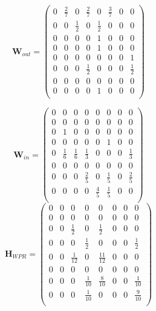 \documentclass[11pt]{report}
\begin{document}
\[\textbf{W}_{out}=\left(
\begin{array}{cccccccc}
0 & \frac{2}{7} & 0 & \frac{2}{7} & 0 &\frac{3}{7} & 0 & 0 \\
0 & 0 &\frac{1}{2}& 0 &\frac{1}{2}& 0 & 0 & 0\\
0 & 0 & 0 & 0 & 1 & 0 & 0 & 0\\
0 & 0 & 0 & 0 & 1 & 0 & 0 & 0\\
0 & 0 & 0 & 0 & 0 & 0 & 0 & 1\\
0 & 0 & 0 & \frac{1}{2} & 0 & 0 & 0 & \frac{1}{2} \\
0 & 0 & 0 & 0 & 0 & 0 & 0 & 0\\
0 & 0 & 0 & 0 & 1 & 0 & 0 & 0\\
\end{array}
\right)	\]

\[\textbf{W}_{in}=\left(
\begin{array}{cccccccc}
0 & 0 & 0 & 0 & 0 & 0 & 0 & 0 \\
0 & 0 & 0 & 0 & 0 & 0 & 0 & 0\\
0 & 1 & 0 & 0 & 0 & 0 & 0 & 0\\
0 & 0 & 0 & 0 & 0 & 1 & 0 & 0\\
0 & \frac{1}{6} & \frac{1}{6} & \frac{1}{3} & 0 & 0 & 0 & \frac{1}{3}\\
0 & 0 & 0 & 0 & 0 & 0 & 0 & 0 \\
0 & 0 & 0 & \frac{2}{5} & 0 & \frac{1}{5} & 0 & \frac{2}{5}\\
0 & 0 & 0 & 0 & \frac{4}{5} & \frac{1}{5} & 0 & 0\\
\end{array}
\right)	\]
\[\textbf{H}_{WPR}=\left(
\begin{array}{cccccccc}
0 & 0 & 0 & 0 & 0 & 0 & 0 & 0 \\
0 & 0 & 0 & 0 & 0 & 0 & 0 & 0\\
0 & 0 & \frac{1}{2} & 0 & \frac{1}{2} & 0 & 0 & 0\\
0 & 0 & 0 & \frac{1}{2} & 0 & 0 & 0 & \frac{1}{2}\\
0 & 0 & \frac{1}{12} & 0 & \frac{11}{12} & 0 & 0 & 0\\
0 & 0 & 0 & 0 & 0 & 0 & 0 & 0 \\
0 & 0 & 0 & \frac{1}{10} & \frac{8}{10} & 0 & 0 & \frac{1}{10}\\
0 & 0 & 0 & \frac{1}{10} & 0 & 0 & 0 & \frac{9}{10}\\
\end{array}
\right)	\]
\end{document}
